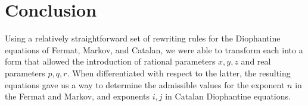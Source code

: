 \documentclass[11pt]{article}
\begin{document}
\section{Conclusion}


Using a relatively straightforward set of rewriting ru\-les for the Diophantine equations of Fermat, Markov, and
Catalan, we were able to transform each into a form that allowed the introduction of rational parameters 
$x, y, z$ and real parameters $p, q, r$\@. When differentiated with respect to the latter, the resulting equations gave us a way to determine the admissible values for the exponent $n$ in the Fermat and Markov, and exponents $i, j$ in Catalan Diophantine equations.







\end{document}
